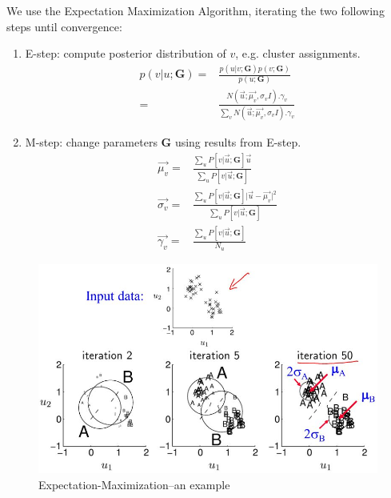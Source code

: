 \documentclass[]{article}
\begin{document}
We use the Expectation Maximization Algorithm, iterating the two following steps until convergence:
\begin{enumerate}
	\item E-step: compute posterior distribution of $v$, e.g. cluster assignments.
	\begin{align*}
		p(v\vert u;\mathbf{G})=&\frac{p(u\vert v ;\mathbf{G}) p(v;\mathbf{G})}{p(u;\mathbf{G})}\\
		=&\frac{N(\vec{u};\vec{\mu_v},\sigma_v I).\gamma_v}{\sum_v N(\vec{u};\vec{\mu_v},\sigma_v I).\gamma_v}
	\end{align*}
	\item M-step: change parameters $\mathbf{G}$ using results from E-step.
	\begin{align*}
		\vec{\mu_v} =&\frac{\sum_u P[v\vert \vec{u};\mathbf{G}]\vec{u}}{\sum_u P[v\vert \vec{u};\mathbf{G}]}\\
		\vec{\sigma_v} =&\frac{\sum_u P[v\vert \vec{u};\mathbf{G}]\lvert \vec{u}-\vec{\mu_v}\rvert^2 }{\sum_u P[v\vert \vec{u};\mathbf{G}]}\\
		\vec{\gamma_v} =&\frac{\sum_u P[v\vert \vec{u};\mathbf{G}]}{N_u}
	\end{align*}
\end{enumerate}

\begin{figure}[H]
	\begin{center}
		\caption{Expectation-Maximization--an example}
		\includegraphics[width=\textwidth]{em-results}
	\end{center}
\end{figure}
\end{document}
